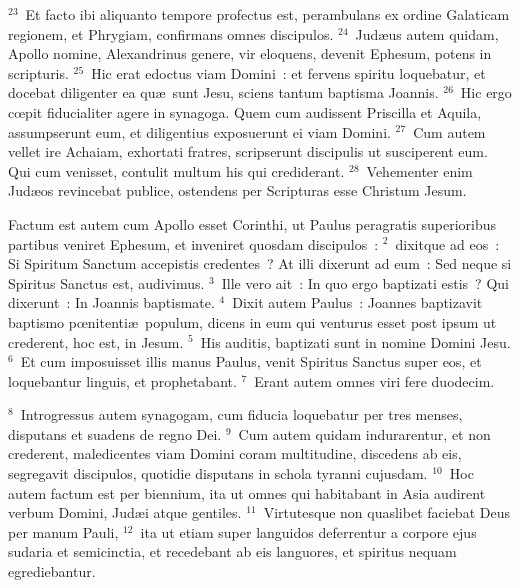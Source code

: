 ${}^{23}$~Et facto ibi aliquanto tempore profectus est, perambulans ex ordine Galaticam regionem, et Phrygiam, confirmans omnes discipulos.
${}^{24}$~Jud\ae us autem quidam, Apollo nomine, Alexandrinus genere, vir eloquens, devenit Ephesum, potens in scripturis.
${}^{25}$~Hic erat edoctus viam Domini~: et fervens spiritu loquebatur, et docebat diligenter ea qu\ae\ sunt Jesu, sciens tantum baptisma Joannis.
${}^{26}$~Hic ergo cœpit fiducialiter agere in synagoga. Quem cum audissent Priscilla et Aquila, assumpserunt eum, et diligentius exposuerunt ei viam Domini.
${}^{27}$~Cum autem vellet ire Achaiam, exhortati fratres, scripserunt discipulis ut susciperent eum. Qui cum venisset, contulit multum his qui crediderant.
${}^{28}$~Vehementer enim Jud\ae os revincebat publice, ostendens per Scripturas esse Christum Jesum.

\lettrine[lines=3,image=true,loversize=0.05,lraise=-0.03]{F}{}actum est autem cum Apollo esset Corinthi, ut Paulus peragratis superioribus partibus veniret Ephesum, et inveniret quosdam discipulos~:
${}^{2}$~dixitque ad eos~: Si Spiritum Sanctum accepistis credentes~? At illi dixerunt ad eum~: Sed neque si Spiritus Sanctus est, audivimus.
${}^{3}$~Ille vero ait~: In quo ergo baptizati estis~? Qui dixerunt~: In Joannis baptismate.
${}^{4}$~Dixit autem Paulus~: Joannes baptizavit baptismo pœnitenti\ae\ populum, dicens in eum qui venturus esset post ipsum ut crederent, hoc est, in Jesum.
${}^{5}$~His auditis, baptizati sunt in nomine Domini Jesu.
${}^{6}$~Et cum imposuisset illis manus Paulus, venit Spiritus Sanctus super eos, et loquebantur linguis, et prophetabant.
${}^{7}$~Erant autem omnes viri fere duodecim.


${}^{8}$~Introgressus autem synagogam, cum fiducia loquebatur per tres menses, disputans et suadens de regno Dei.
${}^{9}$~Cum autem quidam indurarentur, et non crederent, maledicentes viam Domini coram multitudine, discedens ab eis, segregavit discipulos, quotidie disputans in schola tyranni cujusdam.
${}^{10}$~Hoc autem factum est per biennium, ita ut omnes qui habitabant in Asia audirent verbum Domini, Jud\ae i atque gentiles.
${}^{11}$~Virtutesque non quaslibet faciebat Deus per manum Pauli,
${}^{12}$~ita ut etiam super languidos deferrentur a corpore ejus sudaria et semicinctia, et recedebant ab eis languores, et spiritus nequam egrediebantur.


